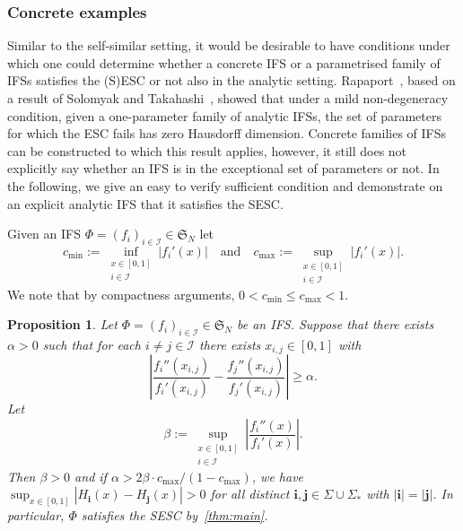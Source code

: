 \documentclass[11pt,]{article}
\def\cref#1{\ref{#1}}%
\newtheorem{proposition}[theorem]{Proposition}
\theoremstyle{definition}
\theoremstyle{remark}
\newcommand{\0}{\mathbf{0}}
\newcommand{\bi}{\mathbf{i}}
\newcommand{\bj}{\mathbf{j}}
\numberwithin{equation}{section}
\begin{document}
\subsubsection{Concrete examples}\label{sec:examples}
Similar to the self-similar setting, it would be desirable to have conditions under which one
could determine whether a concrete IFS or a parametrised family of IFSs satisfies the (S)ESC or not
also in the analytic setting. Rapaport~\cite[Corollary 1.4]{Rapaport_SelfConfESC25arXiv}, based on a
result of Solomyak and Takahashi~\cite{SolomyakTakahashi_IMRN21}, showed that under a mild
non-degeneracy condition, given a one-parameter family of analytic IFSs, the set of parameters for
which the ESC fails has zero Hausdorff dimension. Concrete families of IFSs can be constructed to
which this result applies, however, it still does not explicitly say whether an IFS is in the
exceptional set of parameters or not. 
In the following, we give an easy to verify sufficient condition and demonstrate on
an explicit analytic IFS that it satisfies the SESC. 

Given an IFS $\Phi=(f_i)_{i\in\mathcal{I}}\in\mathfrak{S}_N$ let
\begin{equation}\label{eq:maxmincontract}
  c_{\min} := \inf_{\substack{x\in[0,1] \\ i\in\mathcal{I}}} |f_i'(x)| \quad\text{and}\quad
  c_{\max}:=\sup_{\substack{x\in[0,1] \\ i\in\mathcal{I}}} |f_i'(x)|.
\end{equation}
We note that by compactness arguments, $0<c_{\min} \leq c_{\max} <1$.

\begin{proposition}\label{prop:example}
Let $\Phi=(f_i)_{i\in\mathcal{I}}\in\mathfrak{S}_N$ be an IFS. Suppose that there exists $\alpha>0$
such that for each $i\neq j\in\mathcal{I}$ there exists $x_{i,j}\in[0,1]$ with
\begin{equation*}
\left| \frac{f_i''(x_{i,j})}{f_i'(x_{i,j})} - \frac{f_j''(x_{i,j})}{f_j'(x_{i,j})} \right| \geq \alpha . 
\end{equation*}
Let
\begin{equation*}
  \beta:=\sup_{\substack{x\in[0,1] \\ i\in\mathcal{I}}} \left| \frac{f_i''(x)}{f_i'(x)} \right|.
\end{equation*}
Then $\beta>0$ and if $\alpha > 2\beta\cdot c_{\max}/(1-c_{\max})$, we have
$
\sup_{x\in[0,1]} |H_{\bi}(x) - H_{\bj}(x)| > 0 
$
for all distinct $\bi,\bj \in\Sigma\cup\Sigma_*$ with $|\bi|=|\bj|$. In particular, $\Phi$ satisfies
the SESC by~\cref{thm:main}.
\end{proposition}
\end{document}
